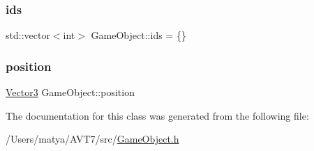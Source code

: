 \mbox{\label{class_game_object_a2213b69db0d43fe8b6a7badb176950f8}} 
\subsubsection{\texorpdfstring{ids}{ids}}
{\footnotesize\ttfamily std\+::vector$<$int$>$ Game\+Object\+::ids = \{\}\hspace{0.3cm}{\ttfamily [protected]}}

\mbox{\label{class_game_object_abdc7864253235aced4171f9a6eeae6e1}} 
\subsubsection{\texorpdfstring{position}{position}}
{\footnotesize\ttfamily \hyperlink{class_vector3}{Vector3} Game\+Object\+::position}



The documentation for this class was generated from the following file\+:\begin{DoxyCompactItemize}
\item 
/\+Users/matya/\+A\+V\+T7/src/\hyperlink{_game_object_8h}{Game\+Object.\+h}\end{DoxyCompactItemize}
